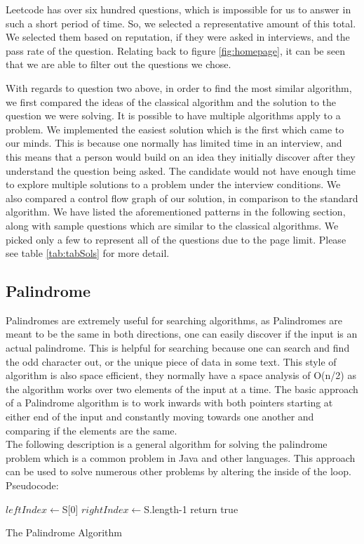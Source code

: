 \documentclass[10pt,twocolumn]{IEEEtran}
\begin{document}
\par Leetcode has over six hundred questions, which is impossible for us to answer in such a short period of time. So, we selected a representative amount of this total. We selected them based on reputation, if they were asked in interviews, and the pass rate of the question. Relating back to figure \ref{fig:homepage}, it can be seen that we are able to filter out the questions we chose.
\par With regards to question two above, in order to find the most similar algorithm, we first compared the ideas of the classical algorithm and the solution to the question we were solving. It is possible to have multiple algorithms apply to a problem. We implemented the easiest solution which is the first which came to our minds. This is because one normally has limited time in an interview, and this means that a person would build on an idea they initially discover after they understand the question being asked. The candidate would not have enough time to explore multiple solutions to a problem under the interview conditions. We also compared a control flow graph of our solution, in comparison to the standard algorithm. We have listed the aforementioned patterns in the following section, along with sample questions which are similar to the classical algorithms. We picked only a few to represent all of the questions due to the page limit. Please see table \ref{tab:tabSols} for more detail.  	 
\subsection{Palindrome}
Palindromes are extremely useful for searching algorithms, as Palindromes are meant to be the same in both directions, one can easily discover if the input is an actual palindrome. This is helpful for searching because one can search and find the odd character out, or the unique piece of data in some text. This style of algorithm is also space efficient, they normally have a space analysis of O(n/2) as the algorithm works over two elements of the input at a time. The basic approach of a Palindrome algorithm is to work inwards with both pointers starting at either end of the input and constantly moving towards one another and comparing if the elements are the same.\\  
The following description is a general algorithm for solving the palindrome problem which is a common problem in Java and other languages. This approach can be used to solve numerous other problems by altering the inside of the loop.
Pseudocode:
\IncMargin{1em}
\begin{algorithm}
	\SetAlgoLined
	$leftIndex  \longleftarrow $S[0]\;
	$rightIndex \longleftarrow $S.length-1\;
return true\;
\caption{The Palindrome Algorithm}
\end{algorithm}\DecMargin{1em}
\end{document}
